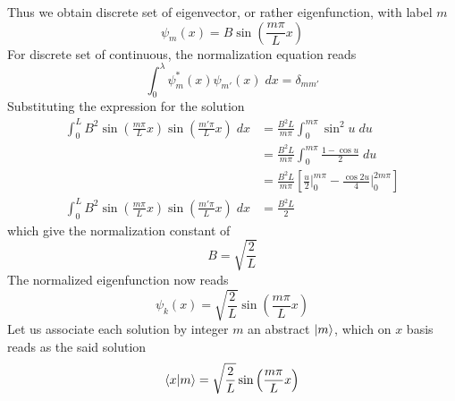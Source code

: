 \documentclass[../main.tex]{subfiles}
\begin{document}
Thus we obtain discrete set of  eigenvector, or rather eigenfunction, with label $m$
\begin{equation*}
	\psi_m(x)=B \sin \left( \frac{m\pi }{L }x \right)
\end{equation*}
For discrete set of continuous, the normalization equation reads
\begin{equation*}
	\int_{0 }^{\lambda} \psi_m ^*(x)\psi_{m'}(x)\;dx=\delta_{mm'}
\end{equation*}
Substituting the expression for the solution  
\begin{align*}
	\int_{0}^{L}B^2 \sin \left( \frac{m\pi }{L }x  \right) \sin \left( \frac{m'\pi }{L }x  \right) \;dx&=\frac{B^2 L }{m\pi }\int_{0 }^{m\pi } \sin^2u\;du\\
	&=\frac{B^2L }{m\pi}\int_{0 }^{m\pi }\frac{1-\cos u}{2}\;du\\
	&=\frac{B^2L }{m\pi} \left[ \frac{u }{2}\bigg|_{0 }^{m\pi}-\frac{\cos 2u}{4}\bigg|_{0 }^{2m\pi} \right] \\
	\int_{0}^{L}B^2 \sin \left( \frac{m\pi }{L }x  \right) \sin \left( \frac{m'\pi }{L }x  \right) \;dx&=\frac{B^2L}{2}
\end{align*}
which give the normalization constant of 
\begin{equation*}
	B=\sqrt{\frac{2 }{L }}
\end{equation*} 
The normalized eigenfunction now reads 
\begin{equation*}
	\psi_k(x)=\sqrt{\frac{ 2 }{L  }}\sin \left( \frac{m\pi }{L }x  \right) 
\end{equation*}
Let us associate each solution by integer $m$ an abstract $\ket{m}$, which on $x$ basis reads as the said solution
\begin{equation*}
	\braket{x|m}=\sqrt{\frac{ 2 }{L  }}\sin \left( \frac{m\pi }{L }x  \right) 
\end{equation*}
\end{document}
